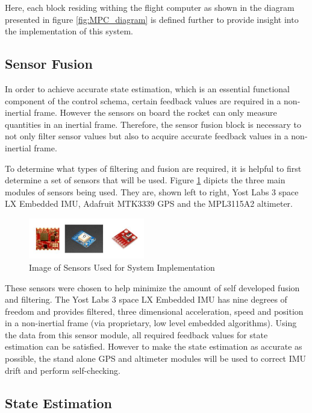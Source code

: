 \documentclass[conference, letterpaper]{IEEEtran}
\begin{document}
Here, each block residing withing the flight computer as shown in
the diagram presented in figure \ref{fig:MPC_diagram} is
defined further to provide insight into the implementation of this
system.

\subsection{Sensor Fusion}

In order to achieve accurate state estimation, which is an essential functional
component of the control schema, certain feedback values are required in a
non-inertial frame. However the sensors on board the rocket can only measure
quantities in an inertial frame. Therefore, the sensor fusion block is necessary
to not only filter sensor values but also to acquire accurate feedback values in
a non-inertial frame.

To determine what types of filtering and fusion are required, it is helpful to
first determine a set of sensors that will be used. Figure \ref{fig:sensors}
dipicts the three main modules of sensors being used. They are, shown left to right,
Yost Labs 3 space LX Embedded IMU, Adafruit MTK3339 GPS and the MPL3115A2 altimeter.

\begin{figure}[H]
\centering
\includegraphics[width=0.45\textwidth]{./sensors}
\caption{Image of Sensors Used for System Implementation}
\label{fig:sensors}
\end{figure}

These sensors were chosen to help minimize the amount of self developed fusion and
filtering. The Yost Labs 3 space LX Embedded IMU has nine degrees of freedom and
provides filtered, three dimensional acceleration, speed and position in a
non-inertial frame (via proprietary, low level embedded algorithms). Using the data
from this sensor module, all required feedback values for state estimation can be
satisfied. However to make the state estimation as accurate as possible, the
stand alone GPS and altimeter modules will be used to correct IMU drift and
perform self-checking.

\subsection{State Estimation}
\end{document}
